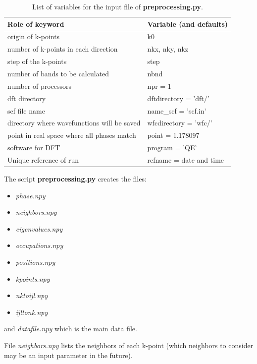 \documentclass[a4paper,12pt]{report}
\begin{document}
\begin{table}[h]
 \centering
 \caption{List of variables for the input file of \textbf{preprocessing.py}.}

 \begin{tabularx}{\textwidth}{Xl}
 \textbf{Role of keyword}  & \textbf{Variable (and defaults)}\\
\hline
 origin of k-points  & k0 \\
 number of k-points in each direction  & nkx, nky, nkz \\
 step of the k-points  & step \\
 number of bands to be calculated  & nbnd \\
 \hline
 number of processors  & npr = 1 \\
 dft directory  & dftdirectory = 'dft/' \\
 scf file name  &     name\_scf = 'scf.in' \\
 directory where wavefunctions will be saved  &     wfcdirectory = 'wfc/' \\
 point in real space where all phases match  & point = 1.178097 \\
 software for DFT  &  program = 'QE' \\
 Unique reference of run & refname = date and time \\
 \hline
\end{tabularx}
 \label{tab:variables_preprocessing}
\end{table}




\newpage
The script \textbf{preprocessing.py} creates the files:
\begin{itemize}
 \item \emph{phase.npy}
 \item \emph{neighbors.npy}
 \item \emph{eigenvalues.npy}
 \item \emph{occupations.npy}
 \item \emph{positions.npy}
 \item \emph{kpoints.npy}
 \item \emph{nktoijl.npy}
 \item \emph{ijltonk.npy}
\end{itemize}
and \emph{datafile.npy} which is the main data file.

File \emph{neighbors.npy} lists the neighbors of each k-point
(which neighbors to consider may be an input parameter in the future).
\end{document}
